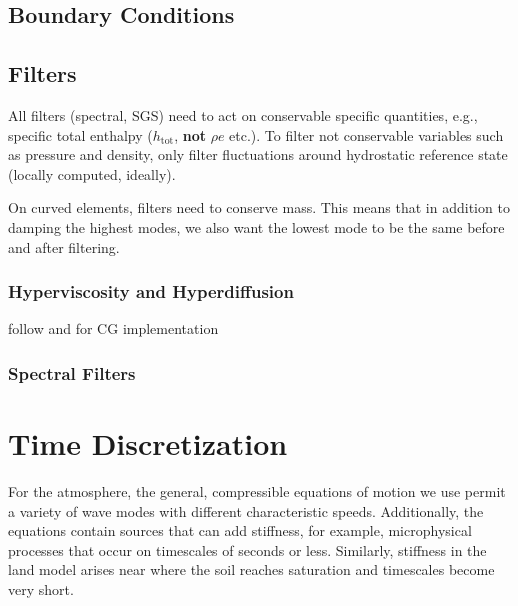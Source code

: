 \documentclass{report}
\begin{document}
\section{Boundary Conditions}

\section{Filters}

All filters (spectral, SGS) need to act on conservable specific quantities, e.g., specific total enthalpy ($h_\mathrm{tot}$, \textbf{not} $\rho e$ etc.). To filter not conservable variables such as pressure and density, only filter fluctuations around hydrostatic reference state (locally computed, ideally).

On curved elements, filters need to conserve mass. This means that in addition to damping the highest modes, we also want the lowest mode to be the same before and after filtering.

\subsection{Hyperviscosity and Hyperdiffusion}

follow \citet{Dennis12a} and \citet{Guba14a} for CG implementation 

\subsection{Spectral Filters}

\chapter{Time Discretization}\label{s:timestepping}

For the atmosphere, the general, compressible equations of motion we use permit a variety of wave modes with different characteristic speeds. Additionally, the equations contain sources that can add stiffness, for example, microphysical processes that occur on timescales of seconds or less. Similarly, stiffness in the land model arises near where the soil reaches saturation and timescales become very short.
\end{document}
